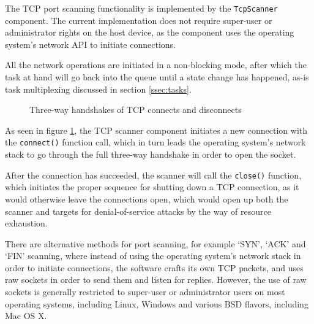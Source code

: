 \documentclass[a4paper,12pt]{article}
\begin{document}
	The TCP port scanning functionality is implemented by the \texttt{TcpScanner} component. The current implementation does not require super-user or administrator rights on the host device, as the component uses the operating system's network API to initiate connections.
	
	All the network operations are initiated in a non-blocking mode, after which the task at hand will go back into the queue until a state change has happened, as-is task multiplexing discussed in section \ref{ssec:tasks}.

	\begin{figure}[!htbp]
		\centering
		\caption{Three-way handshakes of TCP connects and disconnects}
		\label{tcp3way}
	\end{figure}
	
	As seen in figure \ref{tcp3way}, the TCP scanner component initiates a new connection with the \texttt{connect()} function call, which in turn leads the operating system's network stack to go through the full three-way handshake in order to open the socket.
	
	After the connection has succeeded, the scanner will call the \texttt{close()} function, which initiates the proper sequence for shutting down a TCP connection, as it would otherwise leave the connections open, which would open up both the scanner and targets for denial-of-service attacks by the way of resource exhaustion\cite{erickson08}.
	
	There are alternative methods for port scanning, for example `SYN', `ACK' and `FIN' scanning\cite{kris07}, where instead of using the operating system's network stack in order to initiate connections, the software crafts its own TCP packets, and uses raw sockets in order to send them and listen for replies. However, the use of raw sockets is generally restricted to super-user or administrator users on most operating systems, including Linux, Windows and various BSD flavors, including Mac OS X.
	
\end{document}
